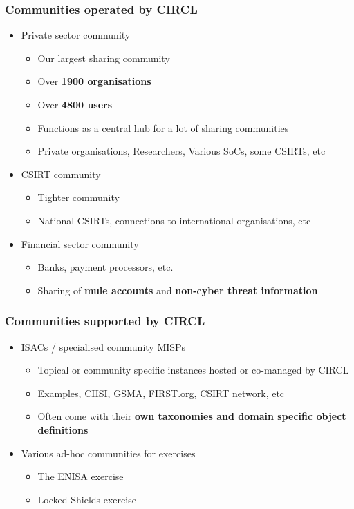 \begin{frame}
	\frametitle{Communities operated by CIRCL}
	\begin{itemize}
		\item Private sector community
		\begin{itemize}
			\item Our largest sharing community
			\item Over \textbf{1900 organisations}
			\item Over \textbf{4800 users}
			\item Functions as a central hub for a lot of sharing communities
			\item Private organisations, Researchers, Various SoCs, some CSIRTs, etc
		\end{itemize}
		\item CSIRT community
		\begin{itemize}
			\item Tighter community
			\item National CSIRTs, connections to international organisations, etc
		\end{itemize}
		\item Financial sector community
		\begin{itemize}
			\item Banks, payment processors, etc.
			\item Sharing of \textbf{mule accounts} and \textbf{non-cyber threat information}
		\end{itemize}
	\end{itemize}
\end{frame}

\begin{frame}
	\frametitle{Communities supported by CIRCL}
	\begin{itemize}
        \item ISACs / specialised community MISPs
        \begin{itemize}
            \item Topical or community specific instances hosted or co-managed by CIRCL
            \item Examples, CIISI, GSMA, FIRST.org, CSIRT network, etc
            \item Often come with their \textbf{own taxonomies and domain specific object definitions}
        \end{itemize}
		\item Various ad-hoc communities for exercises
		\begin{itemize}
			\item The ENISA exercise
			\item Locked Shields exercise
		\end{itemize}
	\end{itemize}
\end{frame}

